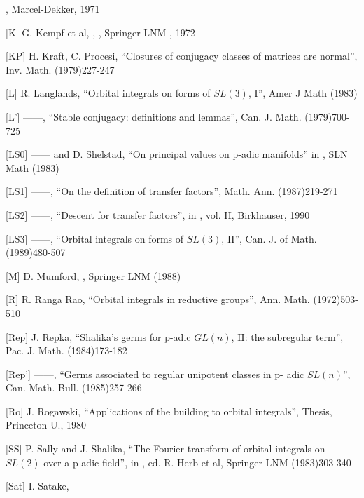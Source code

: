 , Marcel-Dekker, 1971
\item{[K]} G. Kempf et al,  ,
, Springer LNM , 1972
\item{[KP]} H. Kraft, C. Procesi, ``Closures of conjugacy
classes of matrices are normal'', Inv. Math.
(1979)227-247
\item{[L]} R. Langlands, ``Orbital integrals on forms of
$SL(3)$, I'', Amer J Math (1983)
\item{[L']} ------, ``Stable conjugacy: definitions and lemmas'',
Can. J. Math. (1979)700-725
\item{[LS0]} ------ and D. Shelstad, ``On principal values on
p-adic manifolds'' in ,
SLN Math (1983)
\item{[LS1]} ------, ``On the definition of transfer factors'',
Math. Ann. (1987)219-271
\item{[LS2]} ------, ``Descent for transfer factors'', in
 , vol. II,
Birkhauser, 1990
\item{[LS3]} ------, ``Orbital integrals on forms of
$SL(3)$, II'', Can. J. of Math. (1989)480-507
\item{[M]} D. Mumford, 
   
  , Springer LNM
(1988)
\item{[R]} R. Ranga Rao, ``Orbital integrals in reductive groups'',
Ann. Math. (1972)503-510
\item{[Rep]} J. Repka, ``Shalika's germs for p-adic $GL(n)$, II:
the subregular term'', Pac. J. Math. (1984)173-182
\item{[Rep']} ------, ``Germs associated to regular unipotent classes in p-
adic $SL(n)$'', Can. Math. Bull. (1985)257-266
\item{[Ro]} J. Rogawski, ``Applications of the building to orbital
integrals'', Thesis, Princeton U., 1980
\item{[SS]} P. Sally and J. Shalika, ``The Fourier transform of orbital 
integrals on $SL(2)$ over a p-adic field'', in 
  
,
ed. R. Herb et al, Springer LNM (1983)303-340
\item{[Sat]} I. Satake,  
  
